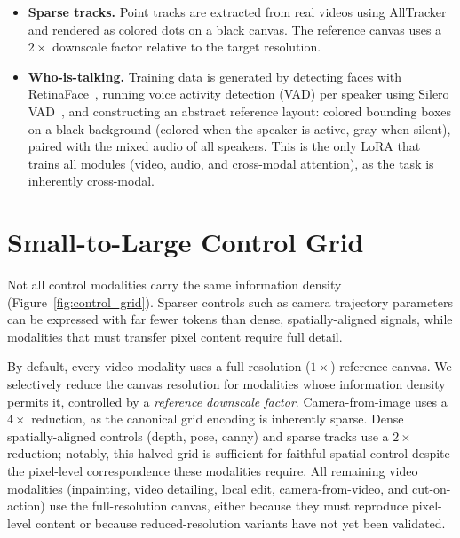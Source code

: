 \begin{itemize}
    \item \textbf{Sparse tracks.} Point tracks are extracted from real videos using AllTracker~\cite{harley2025alltracker} and rendered as colored dots on a black canvas. The reference canvas uses a $2\times$ downscale factor relative to the target resolution.

    \item \textbf{Who-is-talking.} Training data is generated by detecting faces with RetinaFace~\cite{deng2020retinaface}, running voice activity detection (VAD) per speaker using Silero VAD~\cite{silero2024vad}, and constructing an abstract reference layout: colored bounding boxes on a black background (colored when the speaker is active, gray when silent), paired with the mixed audio of all speakers. This is the only LoRA that trains all modules (video, audio, and cross-modal attention), as the task is inherently cross-modal.
\end{itemize}


\section{Small-to-Large Control Grid}
\label{sec:supp_control_grid}



Not all control modalities carry the same information density (Figure~\ref{fig:control_grid}). Sparser controls such as camera trajectory parameters can be expressed with far fewer tokens than dense, spatially-aligned signals, while modalities that must transfer pixel content require full detail.

By default, every video modality uses a full-resolution ($1\times$) reference canvas. We selectively reduce the canvas resolution for modalities whose information density permits it, controlled by a \emph{reference downscale factor}. Camera-from-image uses a $4\times$ reduction, as the canonical grid encoding is inherently sparse. Dense spatially-aligned controls (depth, pose, canny) and sparse tracks use a $2\times$ reduction; notably, this halved grid is sufficient for faithful spatial control despite the pixel-level correspondence these modalities require. All remaining video modalities (inpainting, video detailing, local edit, camera-from-video, and cut-on-action) use the full-resolution canvas, either because they must reproduce pixel-level content or because reduced-resolution variants have not yet been validated.

